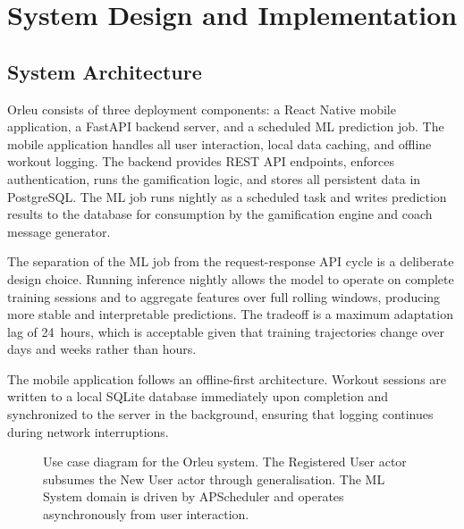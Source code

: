 \documentclass[12pt, a4paper]{report}
\begin{document}
\chapter{System Design and Implementation}
\label{ch:implementation}

\section{System Architecture}

Orleu consists of three deployment components: a React Native mobile application, a FastAPI backend server, and a scheduled ML prediction job. The mobile application handles all user interaction, local data caching, and offline workout logging. The backend provides REST API endpoints, enforces authentication, runs the gamification logic, and stores all persistent data in PostgreSQL. The ML job runs nightly as a scheduled task and writes prediction results to the database for consumption by the gamification engine and coach message generator.

The separation of the ML job from the request-response API cycle is a deliberate design choice. Running inference nightly allows the model to operate on complete training sessions and to aggregate features over full rolling windows, producing more stable and interpretable predictions. The tradeoff is a maximum adaptation lag of 24~hours, which is acceptable given that training trajectories change over days and weeks rather than hours.

The mobile application follows an offline-first architecture. Workout sessions are written to a local SQLite database immediately upon completion and synchronized to the server in the background, ensuring that logging continues during network interruptions.

\begin{figure}[H]
  \centering
  \caption{Use case diagram for the Orleu system. The Registered User actor subsumes the New User actor through generalisation. The ML System domain is driven by APScheduler and operates asynchronously from user interaction.}
  \label{fig:use-case}
\end{figure}
\end{document}
